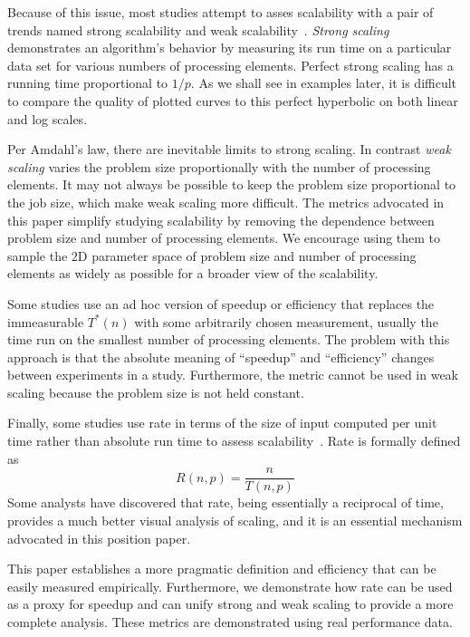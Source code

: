 \documentclass{llncs}
\newcommand*{\lcite}[1]{~\cite{#1}}
\newcommand*{\keyterm}[1]{\emph{#1}}
\begin{document}
Because of this issue, most studies attempt to asses scalability with a
pair of trends named strong scalability and weak
scalability\lcite{Kaminsky2015}. \keyterm{Strong scaling} demonstrates an
algorithm's behavior by measuring its run time on a particular data set for
various numbers of processing elements. Perfect strong scaling has a
running time proportional to $1/p$. As we shall see in examples later, it
is difficult to compare the quality of plotted curves to this perfect
hyperbolic on both linear and log scales.

Per Amdahl's law, there are inevitable limits to strong scaling. In
contrast \keyterm{weak scaling} varies the problem size proportionally with
the number of processing elements. It may not always be possible to keep
the problem size proportional to the job size, which make weak scaling more
difficult. The metrics advocated in this paper simplify studying
scalability by removing the dependence between problem size and number of
processing elements. We encourage using them to sample the 2D parameter
space of problem size and number of processing elements as widely as
possible for a broader view of the scalability.

Some studies use an ad hoc version of speedup or efficiency that replaces the
immeasurable $T^*(n)$ with some arbitrarily chosen measurement, usually the
time run on the smallest number of processing elements. The problem with
this approach is that the absolute meaning of ``speedup'' and
``efficiency'' changes between experiments in a study. Furthermore, the
metric cannot be used in weak scaling because the problem size is not held
constant.

Finally, some studies use rate in terms of the size of input computed per
unit time rather than absolute run time to assess
scalability\lcite{Kaminsky2015}. Rate is formally defined as
\begin{equation}
  R(n,p) = \frac{n}{T(n,p)}
  \label{eq:Rate}
\end{equation}
Some analysts have discovered that rate, being essentially a reciprocal of
time, provides a much better visual analysis of scaling, and it is
an essential mechanism advocated in this position paper.

This paper establishes a more pragmatic definition and efficiency that can
be easily measured empirically. Furthermore, we demonstrate how rate can be
used as a proxy for speedup and can unify strong and weak scaling to
provide a more complete analysis. These metrics are demonstrated using real
performance data.
\end{document}
